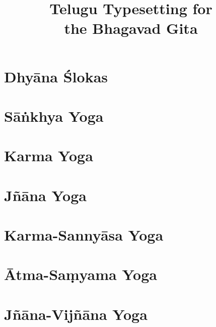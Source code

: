 \documentclass{scrbook}
\title{Telugu Typesetting for \\ the Bhagavad Gita}
\author{}
\begin{document}
\maketitle
\frontmatter

\tableofcontents
\newpage

\chapter{Dhyāna Ślokas}


\mainmatter
\setcounter{chapter}{1}

\chapter{Sāṅkhya Yoga}
\begin{multicols}{2}
    
\end{multicols}

\chapter{Karma Yoga}
\begin{multicols}{2}
    
\end{multicols}

\chapter{Jñāna Yoga}
\begin{multicols}{2}
    
\end{multicols}

\chapter{Karma-Sannyāsa Yoga}
\begin{multicols}{2}
    
\end{multicols}

\chapter{Ātma-Saṃyama Yoga}
\begin{multicols}{2}
    
\end{multicols}

\chapter{Jñāna-Vijñāna Yoga}
\begin{multicols}{2}
    
\end{multicols}
\end{document}
